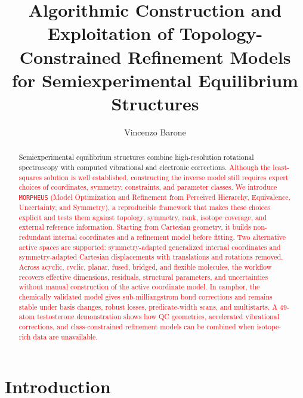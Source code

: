 \documentclass[aip,jcp,reprint,longbibliography,floatfix]{revtex4-2}
\newcommand{\rev}[1]{\textcolor{red}{#1}}
\newcommand{\revabstract}[1]{#1}
\begin{document}
\title{Algorithmic Construction and Exploitation of Topology-Constrained Refinement Models for Semiexperimental Equilibrium Structures}

\author{Vincenzo Barone}

\begin{abstract}
\revabstract{Semiexperimental equilibrium structures combine high-resolution rotational spectroscopy with computed vibrational and electronic corrections. \rev{Although the least-squares solution is well established, constructing the inverse model still requires expert choices of coordinates, symmetry, constraints, and parameter classes. We introduce \texttt{MORPHEUS} (Model Optimization and Refinement from Perceived Hierarchy, Equivalence, Uncertainty, and Symmetry), a reproducible framework that makes these choices explicit and tests them against topology, symmetry, rank, isotope coverage, and external reference information. Starting from Cartesian geometry, it builds non-redundant internal coordinates and a refinement model before fitting. Two alternative active spaces are supported: symmetry-adapted generalized internal coordinates and symmetry-adapted Cartesian displacements with translations and rotations removed. Across acyclic, cyclic, planar, fused, bridged, and flexible molecules, the workflow recovers effective dimensions, residuals, structural parameters, and uncertainties without manual construction of the active coordinate model. In camphor, the chemically validated model gives sub-milliangstrom bond corrections and remains stable under basis changes, robust losses, predicate-width scans, and multistarts. A 49-atom testosterone demonstration shows how QC geometries, accelerated vibrational corrections, and class-constrained refinement models can be combined when isotope-rich data are unavailable.}}

\end{abstract}


\maketitle


\section{Introduction}
\end{document}
